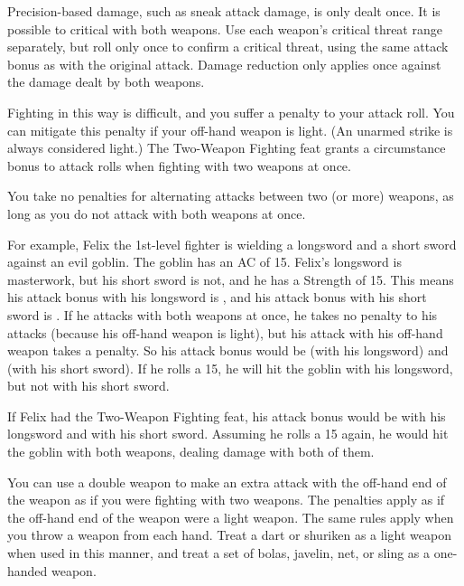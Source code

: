 \par Precision-based damage, such as sneak attack damage, is only dealt once. It is possible to critical with both weapons. Use each weapon's critical threat range separately, but roll only once to confirm a critical threat, using the same attack bonus as with the original attack. Damage reduction only applies once against the damage dealt by both weapons.

\par Fighting in this way is difficult, and you suffer a  penalty to your attack roll. You can mitigate this penalty if your off-hand weapon is light. (An unarmed strike is always considered light.) The Two-Weapon Fighting feat grants a  circumstance bonus to attack rolls when fighting with two weapons at once.

You take no penalties for alternating attacks between two (or more) weapons, as long as you do not attack with both weapons at once.

\par For example, Felix the 1st-level fighter is wielding a longsword and a short sword against an evil goblin. The goblin has an AC of 15. Felix's longsword is masterwork, but his short sword is not, and he has a Strength of 15. This means his attack bonus with his longsword is , and his attack bonus with his short sword is . If he attacks with both weapons at once, he takes no penalty to his attacks (because his off-hand weapon is light), but his attack with his off-hand weapon takes a  penalty. So his attack bonus would be  (with his longsword) and  (with his short sword). If he rolls a 15, he will hit the goblin with his longsword, but not with his short sword.

\par If Felix had the Two-Weapon Fighting feat, his attack bonus would be  with his longsword and  with his short sword. Assuming he rolls a 15 again, he would hit the goblin with both weapons, dealing damage with both of them.

 You can use a double weapon to make an extra attack with the off-hand end of the weapon as if you were fighting with two weapons. The penalties apply as if the off-hand end of the weapon were a light weapon.
 The same rules apply when you throw a weapon from each hand. Treat a dart or shuriken as a light weapon when used in this manner, and treat a set of bolas, javelin, net, or sling as a one-handed weapon.

